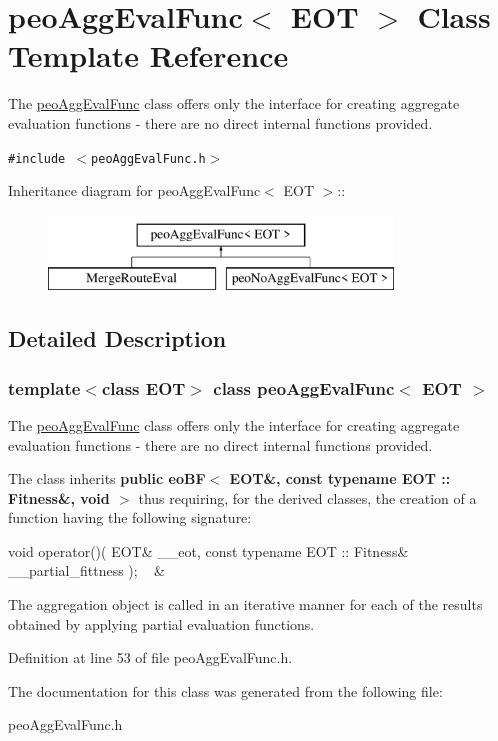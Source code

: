 \hypertarget{classpeoAggEvalFunc}{
\section{peo\-Agg\-Eval\-Func$<$ EOT $>$ Class Template Reference}
\label{classpeoAggEvalFunc}
}
The \hyperlink{classpeoAggEvalFunc}{peo\-Agg\-Eval\-Func} class offers only the interface for creating aggregate evaluation functions - there are no direct internal functions provided.  


{\tt \#include $<$peo\-Agg\-Eval\-Func.h$>$}

Inheritance diagram for peo\-Agg\-Eval\-Func$<$ EOT $>$::\begin{figure}[H]
\begin{center}
\leavevmode
\includegraphics[height=2cm]{classpeoAggEvalFunc}
\end{center}
\end{figure}


\subsection{Detailed Description}
\subsubsection*{template$<$class EOT$>$ class peo\-Agg\-Eval\-Func$<$ EOT $>$}

The \hyperlink{classpeoAggEvalFunc}{peo\-Agg\-Eval\-Func} class offers only the interface for creating aggregate evaluation functions - there are no direct internal functions provided. 

The class inherits {\bf public eo\-BF$<$ EOT\&, const typename EOT :: Fitness\&, void $>$} thus requiring, for the derived classes, the creation of a function having the following signature:

\begin{TabularC}{2}
\hline
void operator()( EOT\& \_\-\_\-eot, const typename EOT :: Fitness\& \_\-\_\-partial\_\-fittness ); ~ &~  \\\hline
\end{TabularC}


The aggregation object is called in an iterative manner for each of the results obtained by applying partial evaluation functions. 



Definition at line 53 of file peo\-Agg\-Eval\-Func.h.

The documentation for this class was generated from the following file:\begin{CompactItemize}
\item 
peo\-Agg\-Eval\-Func.h\end{CompactItemize}

